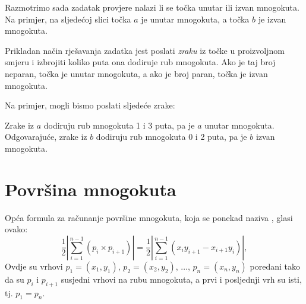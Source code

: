 Razmotrimo sada zadatak
provjere nalazi li se točka unutar ili izvan
mnogokuta.
Na primjer, na sljedećoj slici točka $a$
je unutar mnogokuta, a točka $b$ je izvan
mnogokuta.

\begin{center}
\end{center}

Prikladan način rješavanja zadatka jest
poslati \emph{zraku} iz točke u proizvoljnom smjeru
i izbrojiti koliko puta ona dodiruje
rub mnogokuta.
Ako je taj broj neparan,
točka je unutar mnogokuta,
a ako je broj paran,
točka je izvan mnogokuta.

\begin{samepage}
Na primjer, mogli bismo poslati sljedeće zrake:
\begin{center}
\end{center}
\end{samepage}

Zrake iz $a$ dodiruju rub mnogokuta
1 i 3 puta,
pa je $a$ unutar mnogokuta.
Odgovarajuće, zrake iz $b$
dodiruju rub mnogokuta 0 i 2 puta,
pa je $b$ izvan mnogokuta.

\section{Površina mnogokuta}

Opća formula za računanje površine
mnogokuta, koja se ponekad naziva ,
glasi ovako: 
\[\frac{1}{2} |\sum_{i=1}^{n-1} (p_i \times p_{i+1})| =
\frac{1}{2} |\sum_{i=1}^{n-1} (x_i y_{i+1} - x_{i+1} y_i)|, \]
Ovdje su vrhovi
$p_1=(x_1,y_1)$, $p_2=(x_2,y_2)$, $\ldots$, $p_n=(x_n,y_n)$
poredani tako da su
$p_i$ i $p_{i+1}$ susjedni vrhovi na rubu
mnogokuta,
a prvi i posljednji vrh su isti, tj. $p_1=p_n$.

